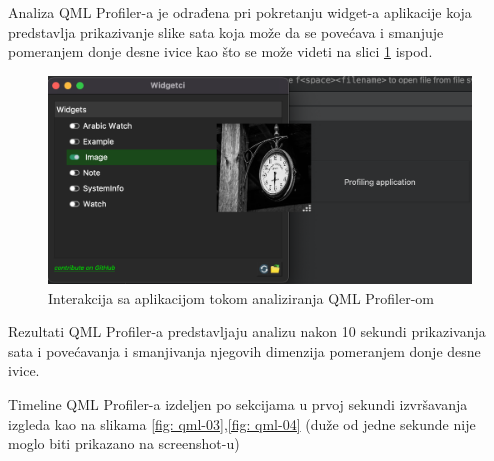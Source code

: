 \documentclass[a4paper]{article}
\begin{document}
Analiza QML Profiler-a je odrađena pri pokretanju widget-a aplikacije koja predstavlja prikazivanje slike sata koja može da se povećava i smanjuje pomeranjem donje desne ivice kao što se može videti na slici \ref{fig: qml-02} ispod.

\begin{figure}[h!]
\begin{center}
\includegraphics[scale=0.40]{qml-prof-02.png}
\end{center}
\caption{Interakcija sa aplikacijom tokom analiziranja QML Profiler-om}
\label{fig: qml-02}
\end{figure}

Rezultati QML Profiler-a predstavljaju analizu nakon 10 sekundi prikazivanja sata i povećavanja i smanjivanja njegovih dimenzija pomeranjem donje desne ivice.

Timeline QML Profiler-a izdeljen po sekcijama u prvoj sekundi izvršavanja izgleda kao na slikama \ref{fig: qml-03},\ref{fig: qml-04}  (duže od jedne sekunde nije moglo biti prikazano na screenshot-u)
\end{document}
